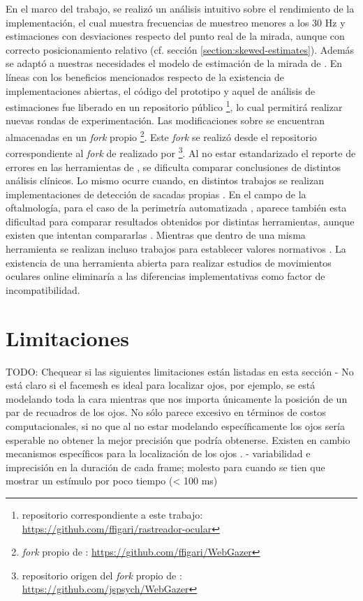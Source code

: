 En el marco del trabajo, se realizó un análisis intuitivo sobre el rendimiento
de la implementación, el cual muestra frecuencias de muestreo menores a los 30
Hz y estimaciones con desviaciones respecto del punto real de la mirada, aunque
con correcto posicionamiento relativo (cf. sección
\ref{section:skewed-estimates}).
Además se adaptó a nuestras necesidades el modelo de estimación de la mirada de
\webgazer.
En líneas con los beneficios mencionados respecto de la existencia de
implementaciones abiertas, el código del prototipo y aquel de análisis de
estimaciones fue liberado en un repositorio público \footnote{repositorio
correspondiente a este trabajo:
\url{https://github.com/ffigari/rastreador-ocular}}, lo cual permitirá
realizar nuevas rondas de experimentación.
Las modificaciones sobre \webgazer se encuentran almacenadas en un
\textit{fork} propio \footnote{\textit{fork} propio de \webgazer:
\url{https://github.com/ffigari/WebGazer}}.
Este \textit{fork} se realizó desde el repositorio correspondiente al
\textit{fork} de \webgazer realizado por \jspsych \footnote{repositorio origen
del \textit{fork} propio de \webgazer:
\url{https://github.com/jspsych/WebGazer}}.
Al no estar estandarizado el reporte de errores en las herramientas de
\eyetracking \cite{zandi_2021_pupilext}, se dificulta comparar conclusiones de
distintos análisis clínicos.
Lo mismo ocurre cuando, en distintos trabajos se realizan implementaciones de
detección de sacadas propias \cite{salvucci_2000_identifying_fixations}.
En el campo de la oftalmología, para el caso de la perimetría automatizada
\cite{pubmed_1996_automated_perimetry}, aparece también esta dificultad para
comparar resultados obtenidos por distintas herramientas, aunque existen que
intentan compararlas \cite{landers_2007_automated_perimeters_comparison}.
Mientras que dentro de una misma herramienta se realizan incluso trabajos para
establecer valores normativos \cite{brenton_1986_humphrey_normal_visual_field}.
La existencia de una herramienta abierta para realizar estudios de movimientos
oculares online eliminaría a las diferencias implementativas como factor de
incompatibilidad.

\section{Limitaciones}

TODO: Chequear si las siguientes limitaciones están listadas en esta sección
- No está claro si el facemesh es ideal para localizar ojos, por ejemplo, se
está modelando toda la cara mientras que nos importa únicamente la posición de
un par de recuadros de los ojos.
No sólo parece excesivo en términos de costos computacionales, si no que al no
estar modelando específicamente los ojos sería esperable no obtener la mejor
precisión que podría obtenerse.
Existen en cambio mecanismos específicos para la localización de los ojos
\cite{hansen_2009_eye_of_the_beholder}.
- variabilidad e imprecisión en la duración de cada frame; molesto para cuando
se tien que mostrar un estímulo por poco tiempo (< 100 ms)



